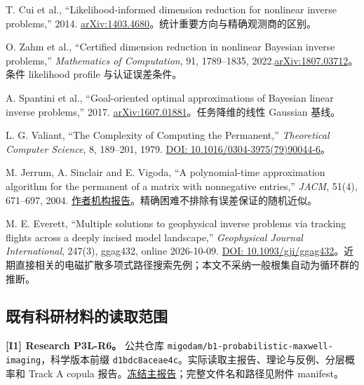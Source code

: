 \begin{enumerate}[label={[R\arabic*]},leftmargin=3.1em,itemsep=7pt]
\item T. Cui et al., ``Likelihood-informed dimension reduction for nonlinear inverse problems,'' 2014. \href{https://arxiv.org/abs/1403.4680}{arXiv:1403.4680}。统计重要方向与精确观测商的区别。
\item O. Zahm et al., ``Certified dimension reduction in nonlinear Bayesian inverse problems,'' \emph{Mathematics of Computation}, 91, 1789--1835, 2022.\newline \href{https://arxiv.org/abs/1807.03712}{arXiv:1807.03712}。条件 likelihood profile 与认证误差条件。
\item A. Spantini et al., ``Goal-oriented optimal approximations of Bayesian linear inverse problems,'' 2017. \href{https://arxiv.org/abs/1607.01881}{arXiv:1607.01881}。任务降维的线性 Gaussian 基线。
\item L. G. Valiant, ``The Complexity of Computing the Permanent,'' \emph{Theoretical Computer Science}, 8, 189--201, 1979. \href{https://doi.org/10.1016/0304-3975(79)90044-6}{DOI: 10.1016/0304-3975(79)90044-6}。
\item M. Jerrum, A. Sinclair and E. Vigoda, ``A polynomial-time approximation algorithm for the permanent of a matrix with nonnegative entries,'' \emph{JACM}, 51(4), 671--697, 2004. \href{https://www.inf.ed.ac.uk/publications/report/0460.html}{作者机构报告}。精确困难不排除有误差保证的随机近似。
\item M. E. Everett, ``Multiple solutions to geophysical inverse problems via tracking flights across a deeply incised model landscape,'' \emph{Geophysical Journal International}, 247(3), ggag432, online 2026-10-09. \href{https://doi.org/10.1093/gji/ggag432}{DOI: 10.1093/gji/ggag432}。近期直接相关的电磁扩散多项式路径搜索先例；本文不采纳一般根集自动为循环群的推断。
\end{enumerate}

\subsection{既有科研材料的读取范围}

\textbf{[I1] Research P3L-R6。} 公共仓库 \texttt{migodam/b1-probabilistic-maxwell-imaging}，科学版本前缀 \texttt{d1bdc8aceae4c}。实际读取主报告、理论与反例、分层概率和 Track A copula 报告。\href{https://raw.githubusercontent.com/migodam/b1-probabilistic-maxwell-imaging/d1bdc8aceae4cd6a843f873b61b019d5eee3cd1d/research/p3l_r6_task_optimal_maxwell/RESEARCH_REPORT_ZH.md}{冻结主报告}；完整文件名和路径见附件 manifest。

